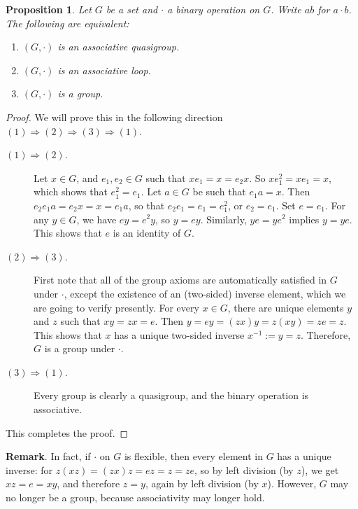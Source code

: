 \documentclass[12pt]{article}
\newtheorem{prop}{Proposition}
\begin{document}
\begin{prop} Let $G$ be a set and $\cdot$ a binary operation on $G$.  Write $ab$ for $a\cdot b$.  The following are equivalent:
\begin{enumerate}
\item $(G,\cdot)$ is an associative quasigroup.
\item $(G,\cdot)$ is an associative loop.
\item $(G,\cdot)$ is a group.
\end{enumerate}
\end{prop}
\begin{proof}  We will prove this in the following direction $(1)\Rightarrow (2) \Rightarrow (3) \Rightarrow (1)$.
\begin{description}
\item[$(1)\Rightarrow (2)$.] Let $x\in G$, and $e_1,e_2\in G$ such that $xe_1=x=e_2x$.  So $xe_1^2=xe_1=x$, which shows that $e_1^2=e_1$.  Let $a\in G$ be such that $e_1a=x$.  Then $e_2e_1a=e_2x=x=e_1a$, so that $e_2e_1=e_1=e_1^2$, or $e_2=e_1$.  Set $e=e_1$.  For any $y\in G$, we have $ey=e^2y$, so $y=ey$.  Similarly, $ye=ye^2$ implies $y=ye$.  This shows that $e$ is an identity of $G$.
\item[$(2)\Rightarrow (3)$.]
First note that all of the group axioms are automatically satisfied in $G$ under $\cdot$, except the existence of an (two-sided) inverse element, which we are going to verify presently.  For every $x\in G$, there are unique elements $y$ and $z$ such that $x y=z x=e$.  Then $y = e y = (z x)  y = z (x y)= z e = z$.  This shows that $x$ has a unique two-sided inverse $x^{-1}:=y=z$.  Therefore, $G$ is a group under $\cdot$.
\item[$(3)\Rightarrow (1)$.]
Every group is clearly a quasigroup, and the binary operation is associative.
\end{description}
This completes the proof.
\end{proof}

\textbf{Remark}.  In fact, if $\cdot$ on $G$ is flexible, then every element in $G$ has a unique inverse: for $z (x z) = (z x) z = e z = z = z e$, so by left division (by $z$), we get $x z=e=x y$, and therefore $z=y$, again by left division (by $x$).  However, $G$ may no longer be a group, because associativity may longer hold.
\end{document}
